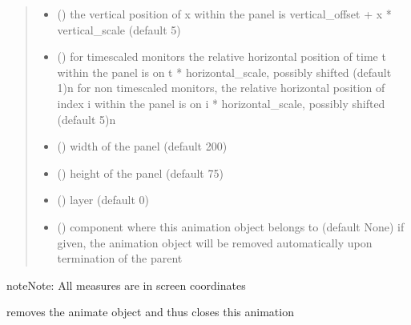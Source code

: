 \documentclass[letterpaper,10pt,english]{sphinxmanual}
\begin{document}
\begin{fulllineitems}
\begin{quote}
\begin{description}
\begin{itemize}
\begin{description}
\end{description}


\item {} 
 () \textendash{} the vertical position of x within the panel is
vertical\_offset + x * vertical\_scale (default 5)

\item {} 
 () \textendash{} for timescaled monitors the relative horizontal position of time t within the panel is on
t * horizontal\_scale, possibly shifted (default 1)\textbar{}n\textbar{}
for non timescaled monitors, the relative horizontal position of index i within the panel is on
i * horizontal\_scale, possibly shifted (default 5)\textbar{}n\textbar{}

\item {} 
 () \textendash{} width of the panel (default 200)

\item {} 
 () \textendash{} height of the panel (default 75)

\item {} 
 () \textendash{} layer (default 0)

\item {} 
 ({\hyperref[\detokenize{Reference:salabim.Component}]{}}) \textendash{} component where this animation object belongs to (default None) 
if given, the animation object will be removed
automatically upon termination of the parent

\end{itemize}

\end{description}\end{quote}

\begin{sphinxadmonition}{note}{Note:}
All measures are in screen coordinates 
\end{sphinxadmonition}

\begin{fulllineitems}
\label{\detokenize{Reference:salabim.AnimateMonitor.remove}}
removes the animate object and thus closes this animation

\end{fulllineitems}


\end{fulllineitems}
\end{document}
